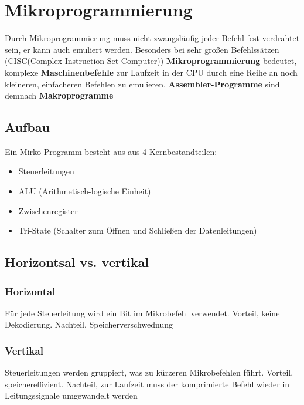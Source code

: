 \section{Mikroprogrammierung}
		Durch Mikroprogrammierung muss nicht zwangsläufig jeder Befehl fest verdrahtet sein, er kann auch emuliert werden. Besonders bei sehr großen Befehlssätzen (CISC(Complex Instruction Set Computer)) \newline \newline
		\textbf{Mikroprogrammierung} bedeutet, komplexe \textbf{Maschinenbefehle} zur Laufzeit in der CPU durch eine Reihe an noch kleineren, einfacheren Befehlen zu emulieren. \textbf{Assembler-Programme} sind demnach \textbf{Makroprogramme}
	\subsection{Aufbau}
		Ein Mirko-Programm besteht aus aus 4 Kernbestandteilen:
		\begin{itemize}
	  		\item Steuerleitungen
	  		\item ALU (Arithmetisch-logische Einheit)
	  		\item Zwischenregister
	  		\item Tri-State (Schalter zum Öffnen und Schließen der Datenleitungen)
		\end{itemize}
	\subsection{Horizontsal vs. vertikal}
		\subsubsection{Horizontal}
			Für jede Steuerleitung wird ein Bit im Mikrobefehl verwendet. Vorteil, keine Dekodierung. Nachteil, Speicherverschwednung
		\subsubsection{Vertikal}
			Steuerleitungen werden gruppiert, was zu kürzeren Mikrobefehlen führt. Vorteil, speichereffizient. Nachteil, zur Laufzeit muss der komprimierte Befehl wieder in Leitungssignale umgewandelt werden
